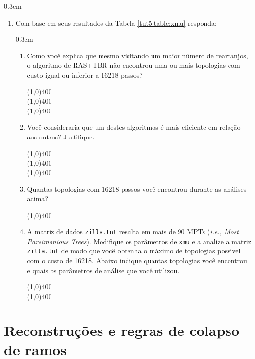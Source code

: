 \begin{refsection}
\begin {myindentpar}{0.3cm}
\begin{enumerate}[\itshape i.]
	\item{Com base em seus resultados da Tabela \ref{tut5:table:xmu} responda:}\\
	  \begin {myindentpar}{0.3cm}
	  \begin{enumerate}[\itshape a.]
		\item{Como você explica que mesmo visitando um maior número de rearranjos, o algoritmo de RAS+TBR não encontrou uma ou mais topologias com custo igual ou inferior a 16218 passos?}
			\begin{center}
			\line(1,0){400}\\
			\line(1,0){400}\\
			\line(1,0){400}\\
			\end{center}
		\item{Você consideraria que um destes algoritmos é mais eficiente em relação aos outros? Justifique.}
			\begin{center}
			\line(1,0){400}\\
			\line(1,0){400}\\
			\line(1,0){400}\\
			\end{center}
		\item{Quantas topologias com 16218 passos você encontrou durante as análises acima?}
			\begin{center}
			\line(1,0){400}\\
			\end{center}
		\item{A matriz de dados \texttt{zilla.tnt} resulta em mais de 90 MPTs (\textit{i.e., Most Parsimonious Trees}). Modifique os parâmetros de \texttt{xmu} e a analize a matriz \texttt{zilla.tnt} de modo que você obtenha o máximo de topologias possível com o custo de 16218. Abaixo indique quantas topologias você encontrou e quais os parâmetros de análise que você utilizou.}
			\begin{center}
			\line(1,0){400}\\
			\line(1,0){400}\\
			\end{center}
	  \end{enumerate}
	  \end{myindentpar}
\end{enumerate}
\end{myindentpar}


\section{Reconstruções e regras de colapso de ramos}\label{tut5:recons}


\end{refsection}
